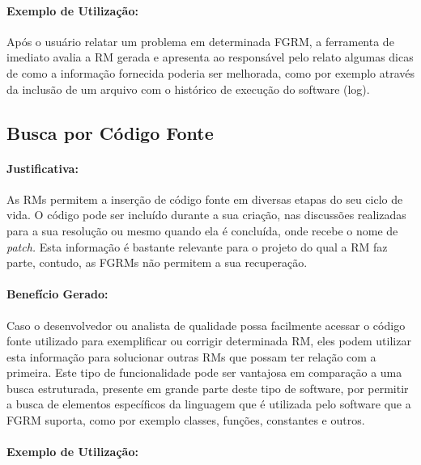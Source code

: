 \paragraph{Exemplo de Utilização:}
\label{par:exemplo_s01}

Após o usuário relatar um problema em determinada FGRM, a ferramenta de imediato
avalia a RM gerada e apresenta ao responsável pelo relato algumas dicas de como
a informação fornecida poderia ser melhorada, como por exemplo através da
inclusão de um arquivo com o histórico de execução do software (log).

\subsection{Busca por Código Fonte}
\label{sub:busca_por_código_fonte}


\paragraph{Justificativa:}
\label{par:justificativa_s02}

As RMs permitem a inserção de código fonte em diversas etapas do seu ciclo de
vida. O código pode ser incluído durante a sua criação, nas discussões
realizadas para a sua resolução ou mesmo quando ela é concluída, onde recebe o
nome de \textit{patch.} Esta informação é bastante relevante para o projeto do
qual a RM faz parte, contudo, as FGRMs não permitem a sua recuperação.

\paragraph{Benefício Gerado:}
\label{par:beneficios_s02}

Caso o desenvolvedor ou analista de qualidade possa facilmente acessar o código
fonte utilizado para exemplificar ou corrigir determinada RM, eles podem
utilizar esta informação para solucionar outras RMs que possam ter relação com
a primeira. Este tipo de funcionalidade pode ser vantajosa em comparação a uma
busca estruturada, presente em grande parte deste tipo de software, por permitir
a busca de elementos específicos da linguagem que é utilizada pelo software que
a FGRM suporta, como por exemplo classes, funções, constantes e outros.

\paragraph{Exemplo de Utilização:}
\label{par:exemplo_s02}

